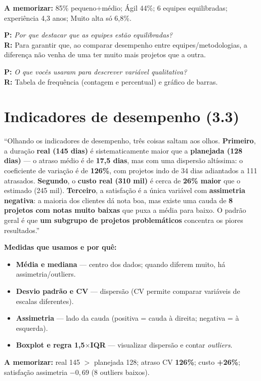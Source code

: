 \documentclass[a4paper, 11pt]{article}
\newcommand{\pergunta}[2]{\par\smallskip\noindent\textbf{P:} \emph{#1}\\
  \textbf{R:} #2}
\begin{document}
\textbf{A memorizar:} 85\% pequeno+médio; Ágil 44\%; 6 equipes equilibradas; experiência 4,3 anos;
Muito alta só 6,8\%.

\pergunta{Por que destacar que as equipes estão equilibradas?}{Para garantir que, ao comparar desempenho entre equipes/metodologias, a diferença não venha de uma ter muito mais projetos que a outra.}
\pergunta{O que vocês usaram para descrever variável qualitativa?}{Tabela de frequência (contagem e percentual) e gráfico de barras.}

\section{Indicadores de desempenho (3.3)}

\begin{roteiro}
``Olhando os indicadores de desempenho, três coisas saltam aos olhos. \textbf{Primeiro}, a
duração \textbf{real (145 dias)} é sistematicamente maior que a \textbf{planejada (128 dias)} --- o
atraso médio é de \textbf{17,5 dias}, mas com uma dispersão altíssima: o coeficiente de variação
é de \textbf{126\%}, com projetos indo de 34 dias adiantados a 111 atrasados. \textbf{Segundo}, o
\textbf{custo real (310 mil)} é cerca de \textbf{26\% maior} que o estimado (245 mil).
\textbf{Terceiro}, a satisfação é a única variável com \textbf{assimetria negativa}: a maioria dos
clientes dá nota boa, mas existe uma cauda de \textbf{8 projetos com notas muito baixas} que
puxa a média para baixo. O padrão geral é que \textbf{um subgrupo de projetos problemáticos}
concentra os piores resultados.''
\end{roteiro}

\textbf{Medidas que usamos e por quê:}
\begin{itemize}[noitemsep]
	\item \textbf{Média e mediana} --- centro dos dados; quando diferem muito, há assimetria/outliers.
	\item \textbf{Desvio padrão e CV} --- dispersão (CV permite comparar variáveis de escalas diferentes).
	\item \textbf{Assimetria} --- lado da cauda (positiva = cauda à direita; negativa = à esquerda).
	\item \textbf{Boxplot e regra 1,5$\times$IQR} --- visualizar dispersão e contar \emph{outliers}.
\end{itemize}

\textbf{A memorizar:} real 145 $>$ planejada 128; atraso CV \textbf{126\%}; custo \textbf{+26\%};
satisfação assimetria \textbf{$-0{,}69$} (8 outliers baixos).
\end{document}
